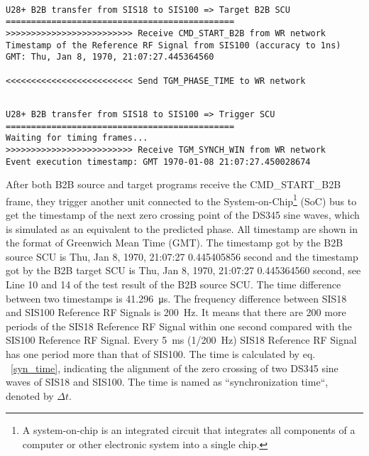 \begin{lstlisting}[language={[ANSI]C}, keywordstyle=\color{blue!70}, commentstyle=\color{red!50!green!50!blue!50}, frame=shadowbox, rulesepcolor=\color{red!20!green!20!blue!20}]

U28+ B2B transfer from SIS18 to SIS100 => Target B2B SCU
=============================================
>>>>>>>>>>>>>>>>>>>>>>>>> Receive CMD_START_B2B from WR network
Timestamp of the Reference RF Signal from SIS100 (accuracy to 1ns)
GMT: Thu, Jan 8, 1970, 21:07:27.445364560

<<<<<<<<<<<<<<<<<<<<<<<<< Send TGM_PHASE_TIME to WR network
\end{lstlisting}

\begin{lstlisting}[language={[ANSI]C}, keywordstyle=\color{blue!70}, commentstyle=\color{red!50!green!50!blue!50}, frame=shadowbox, rulesepcolor=\color{red!20!green!20!blue!20}]

U28+ B2B transfer from SIS18 to SIS100 => Trigger SCU
=============================================
Waiting for timing frames...
>>>>>>>>>>>>>>>>>>>>>>>>> Receive TGM_SYNCH_WIN from WR network
Event execution timestamp: GMT 1970-01-08 21:07:27.450028674
\end{lstlisting}

After both B2B source and target programs receive the CMD\_START\_B2B frame, they trigger another unit connected to the System-on-Chip\footnote{A system-on-chip is an integrated circuit that integrates all components of a computer or other electronic system into a single chip.}  (SoC) bus to get the timestamp of the next zero crossing point of the DS345 sine waves, which is simulated as an equivalent to the predicted phase. All timestamp are shown in the format of Greenwich Mean Time (GMT). The timestamp got by the B2B source SCU is Thu, Jan 8, 1970, 21:07:27 0.445405856 second and the timestamp got by the B2B target SCU is Thu, Jan 8, 1970, 21:07:27 0.445364560 second, see Line 10 and 14 of the test result of the B2B source SCU. The time difference between two timestamps is \SI{41.296}{\us}. The frequency difference between SIS18 and SIS100 Reference RF Signals is \SI{200}{Hz}. It means that there are 200 more periods of the SIS18 Reference RF Signal within one second compared with the SIS100 Reference RF Signal. Every \SI{5}{ms} (1/\SI{200}{Hz}) SIS18 Reference RF Signal has one period more than that of SIS100. The time is calculated by eq. ~\ref {syn_time}, indicating the alignment of the zero crossing of two DS345 sine waves of SIS18 and SIS100. The time is named as ``synchronization time``, denoted by $\Delta t$.

